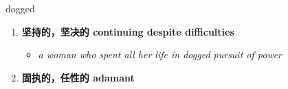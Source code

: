 
\begin{frame}
{\huge dogged}
\begin{center}
\begin{enumerate}\Large
  \item \textbf{坚持的，坚决的 continuing despite difficulties}
  \begin{itemize}
    \item \em{\Large{a woman who spent all her life in dogged pursuit of power}}
  \end{itemize}
  \item \textbf{固执的，任性的 adamant}
\end{enumerate}
\end{center}
\end{frame}
